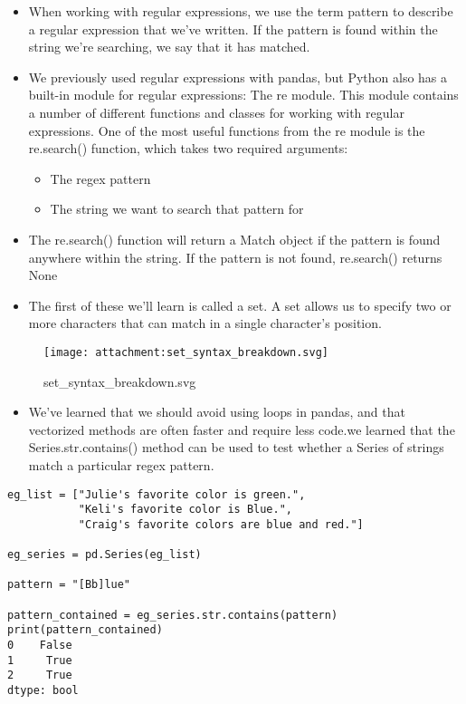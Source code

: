 \documentclass[11pt]{article}
\providecommand{\tightlist}{%
      \setlength{\itemsep}{0pt}\setlength{\parskip}{0pt}}
\begin{document}
    \begin{itemize}
\tightlist
\item
  When working with regular expressions, we use the term pattern to
  describe a regular expression that we've written. If the pattern is
  found within the string we're searching, we say that it has matched.
\item
  We previously used regular expressions with pandas, but Python also
  has a built-in module for regular expressions: The re module. This
  module contains a number of different functions and classes for
  working with regular expressions. One of the most useful functions
  from the re module is the re.search() function, which takes two
  required arguments:

  \begin{itemize}
  \tightlist
  \item
    The regex pattern
  \item
    The string we want to search that pattern for
  \end{itemize}
\item
  The re.search() function will return a Match object if the pattern is
  found anywhere within the string. If the pattern is not found,
  re.search() returns None
\item
  The first of these we'll learn is called a set. A set allows us to
  specify two or more characters that can match in a single character's
  position.
\end{itemize}

\begin{figure}
\centering
\texttt{[image: attachment:set\_syntax\_breakdown.svg]}
\caption{set\_syntax\_breakdown.svg}
\end{figure}

\begin{itemize}
\tightlist
\item
  We've learned that we should avoid using loops in pandas, and that
  vectorized methods are often faster and require less code.we learned
  that the Series.str.contains() method can be used to test whether a
  Series of strings match a particular regex pattern.
\end{itemize}

\begin{verbatim}
eg_list = ["Julie's favorite color is green.",
           "Keli's favorite color is Blue.",
           "Craig's favorite colors are blue and red."]

eg_series = pd.Series(eg_list)

pattern = "[Bb]lue"

pattern_contained = eg_series.str.contains(pattern)
print(pattern_contained)
0    False
1     True
2     True
dtype: bool
\end{verbatim}
\end{document}
